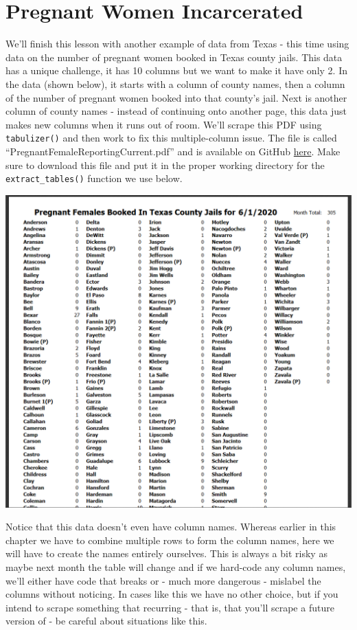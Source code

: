\documentclass[
  12pt,
  openany]{book}
\begin{document}
\hypertarget{pregnant-women-incarcerated}{%
\section{Pregnant Women Incarcerated}\label{pregnant-women-incarcerated}}

We'll finish this lesson with another example of data from Texas - this time using data on the number of pregnant women booked in Texas county jails. This data has a unique challenge, it has 10 columns but we want to make it have only 2. In the data (shown below), it starts with a column of county names, then a column of the number of pregnant women booked into that county's jail. Next is another column of county names - instead of continuing onto another page, this data just makes new columns when it runs out of room. We'll scrape this PDF using \texttt{tabulizer()} and then work to fix this multiple-column issue. The file is called ``PregnantFemaleReportingCurrent.pdf'' and is available on GitHub \href{https://github.com/jacobkap/crimebythenumbers/blob/master/data/PregnantFemaleReportingCurrent.pdf}{here}. Make sure to download this file and put it in the proper working directory for the \texttt{extract\_tables()} function we use below.

\includegraphics{images/pregnant.PNG}

Notice that this data doesn't even have column names. Whereas earlier in this chapter we have to combine multiple rows to form the column names, here we will have to create the names entirely ourselves. This is always a bit risky as maybe next month the table will change and if we hard-code any column names, we'll either have code that breaks or - much more dangerous - mislabel the columns without noticing. In cases like this we have no other choice, but if you intend to scrape something that recurring - that is, that you'll scrape a future version of - be careful about situations like this.
\end{document}
